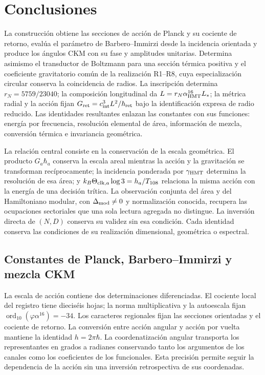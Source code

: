 \section{Conclusiones}
\label{sec:ii-conclusiones}

La construcción obtiene las secciones de acción de Planck y su cociente
de retorno, evalúa el parámetro de Barbero--Immirzi desde la incidencia
orientada y produce los ángulos CKM con su fase y amplitudes unitarias.
Determina asimismo el transductor de Boltzmann para una sección térmica
positiva y el coeficiente gravitatorio común de la realización R1--R8,
cuya especialización circular conserva la coincidencia de radios.
La inscripción determina \(r_N=5759/23040\); la composición longitudinal
da \(L=r_N\alpha_{\mathrm{HMT}}^{16}L_*\); la métrica radial y la acción
fijan \(G_{\rm ret}=c_{\rm int}^3L^2/\hbar_{\rm ret}\) bajo la
identificación expresa de radio reducido. Las identidades resultantes enlazan las constantes
con sus funciones: energía por frecuencia, resolución elemental de área,
información de mezcla, conversión térmica e invariancia geométrica.

La relación central consiste en la conservación de la escala geométrica.
El producto \(G_a\hbar_a\) conserva la escala areal mientras la acción
y la gravitación se transforman recíprocamente; la incidencia ponderada
por \(\gamma_{\mathrm{HMT}}\) determina la resolución de esa área; y
\(k_B\Theta_{{\rm clk},a}\log3=h_a/T_{108}\) relaciona la misma acción
con la energía de una decisión trítica. La observación conjunta del área
y del Hamiltoniano modular, con \(\Delta_{\rm mod}\ne0\) y
normalización conocida, recupera las ocupaciones sectoriales que
una sola lectura agregada no distingue. La inversión directa de
\((N,D)\) conserva su validez sin esa condición. Cada identidad conserva las
condiciones de su realización dimensional, geométrica o espectral.

\subsection{Constantes de Planck, Barbero--Immirzi y mezcla CKM}

La escala de acción contiene dos determinaciones diferenciadas. El
cociente local del registro tiene dieciséis hojas; la norma multiplicativa
y la autoescala fijan \(\operatorname{ord}_{10}(\varphi\alpha^{16})=-34\). Los caracteres regionales fijan las secciones orientadas
y el cociente de retorno. La conversión entre acción angular y acción
por vuelta mantiene la identidad \(h=2\pi\hbar\). La coordenatización angular
transporta los representantes en grados a radianes conservando tanto
los argumentos de los canales como los coeficientes de los funcionales.
Esta precisión permite seguir la dependencia de la acción sin una
inversión retrospectiva de sus coordenadas.

